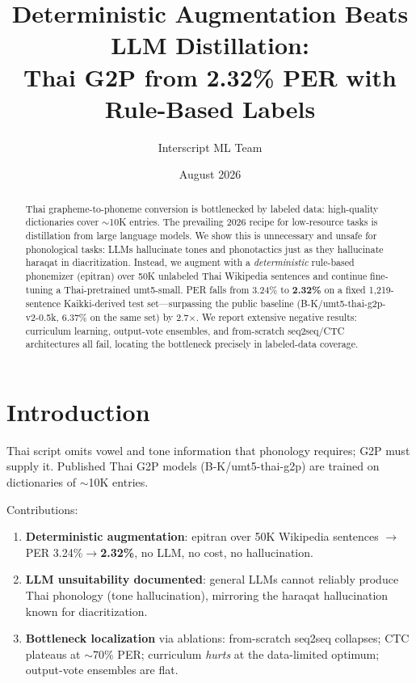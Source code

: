 \documentclass[11pt]{article}
\title{Deterministic Augmentation Beats LLM Distillation:\\ Thai G2P from 2.32\% PER with Rule-Based Labels}
\author{Interscript ML Team}
\date{August 2026}
\begin{document}
\maketitle

\begin{abstract}
Thai grapheme-to-phoneme conversion is bottlenecked by labeled data:
high-quality dictionaries cover $\sim$10K entries. The prevailing 2026
recipe for low-resource tasks is distillation from large language
models. We show this is unnecessary and unsafe for phonological tasks:
LLMs hallucinate tones and phonotactics just as they hallucinate haraqat
in diacritization. Instead, we augment with a \emph{deterministic}
rule-based phonemizer (epitran) over 50K unlabeled Thai Wikipedia
sentences and continue fine-tuning a Thai-pretrained umt5-small. PER
falls from 3.24\% to \textbf{2.32\%} on a fixed 1,219-sentence
Kaikki-derived test set---surpassing the public baseline
(B-K/umt5-thai-g2p-v2-0.5k, 6.37\% on the same set) by 2.7$\times$. We
report extensive negative results: curriculum learning, output-vote
ensembles, and from-scratch seq2seq/CTC architectures all fail, locating
the bottleneck precisely in labeled-data coverage.
\end{abstract}

\section{Introduction}
Thai script omits vowel and tone information that phonology requires; G2P
must supply it. Published Thai G2P models (B-K/umt5-thai-g2p) are trained
on dictionaries of $\sim$10K entries.

Contributions:
\begin{enumerate}
  \item \textbf{Deterministic augmentation}: epitran over 50K Wikipedia
        sentences $\rightarrow$ PER 3.24\%$\to$\textbf{2.32\%}, no LLM,
        no cost, no hallucination.
  \item \textbf{LLM unsuitability documented}: general LLMs cannot
        reliably produce Thai phonology (tone hallucination), mirroring
        the haraqat hallucination known for diacritization.
  \item \textbf{Bottleneck localization} via ablations: from-scratch
        seq2seq collapses; CTC plateaus at $\sim$70\% PER; curriculum
        \emph{hurts} at the data-limited optimum; output-vote ensembles
        are flat.
\end{enumerate}
\end{document}
